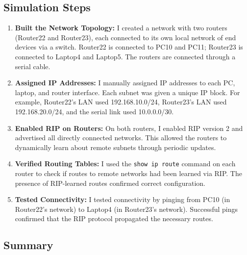 \documentclass[11pt,a4paper]{article}
\let\oldincludegraphics\includegraphics
\renewcommand{\includegraphics}[2][]{%
  \begin{center}
    \oldincludegraphics[#1]{#2}
  \end{center}
}
\begin{document}
\subsection{Simulation Steps}
\begin{enumerate}

\item \textbf{Built the Network Topology:} I created a network with two routers (Router22 and Router23), each connected to its own local network of end devices via a switch. Router22 is connected to PC10 and PC11; Router23 is connected to Laptop4 and Laptop5. The routers are connected through a serial cable.


\item \textbf{Assigned IP Addresses:} I manually assigned IP addresses to each PC, laptop, and router interface. Each subnet was given a unique IP block. For example, Router22's LAN used 192.168.10.0/24, Router23's LAN used 192.168.20.0/24, and the serial link used 10.0.0.0/30.


\item \textbf{Enabled RIP on Routers:} On both routers, I enabled RIP version 2 and advertised all directly connected networks. This allowed the routers to dynamically learn about remote subnets through periodic updates.


\item \textbf{Verified Routing Tables:} I used the \texttt{show ip route} command on each router to check if routes to remote networks had been learned via RIP. The presence of RIP-learned routes confirmed correct configuration.


\item \textbf{Tested Connectivity:} I tested connectivity by pinging from PC10 (in Router22’s network) to Laptop4 (in Router23’s network). Successful pings confirmed that the RIP protocol propagated the necessary routes.


\end{enumerate}

\subsection{Summary}
\end{document}
